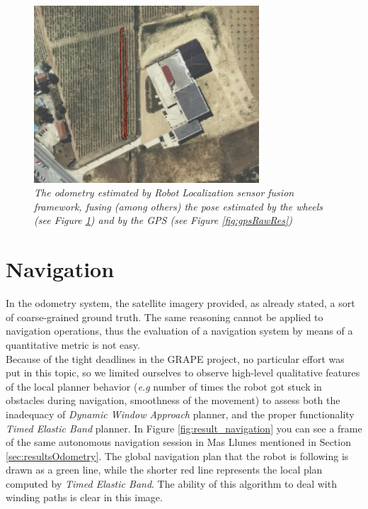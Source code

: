 \begin{figure}
	\centering
	\includegraphics[width=0.75\textwidth]{Images/experimental_data/rob_loc_result.png}
	\caption{\textit{The odometry estimated by Robot Localization sensor fusion framework, fusing (among others) the pose estimated by the wheels (see Figure \ref{fig:wheelsOdometryRes}) and by the GPS (see Figure \ref{fig:gpsRawRes})}}
	\label{fig:wheelsOdometryRes}
\end{figure}

\section{Navigation}

In the odometry system, the satellite imagery provided, as already stated, a sort of coarse-grained ground truth. The same reasoning cannot be applied to navigation operations, thus the evaluation of a navigation system by means of a quantitative metric is not easy. \\
Because of the tight deadlines in the \ac{GRAPE} project, no particular effort was put in this topic, so we limited ourselves to observe high-level qualitative features of the local planner behavior (\textit{e.g} number of times the robot got stuck in obstacles during navigation, smoothness of the movement) to assess both the inadequacy of \textit{Dynamic Window Approach} planner, and the proper functionality \textit{Timed Elastic Band} planner.
In Figure \ref{fig:result_navigation} you can see a frame of the same autonomous navigation session in Mas Llunes mentioned in Section \ref{sec:resultsOdometry}. The global navigation plan that the robot is following is drawn as a green line, while the shorter red line represents the local plan computed by  \textit{Timed Elastic Band}. The ability of this algorithm to deal with winding paths is clear in this image.

